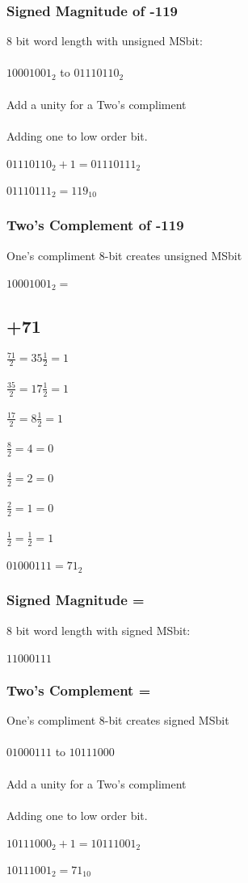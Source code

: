 \documentclass[12pt]{article}
\begin{document}
\subsubsection{Signed Magnitude of -119}
8 bit word length with unsigned MSbit: \\ \\
$10001001_2$ to $01110110_2$ \\ \\
Add a unity for a Two's compliment \\ \\
Adding one to low order bit. \\ \\
$01110110_2 + 1 = 01110111_2$ \\ \\
$01110111_2 = 119_{10}$
\subsubsection{Two's Complement of -119}
One's compliment 8-bit creates unsigned MSbit\\ \\
$10001001_2 =$
\subsection{+71}
$\frac{71}{2} = 35\frac{1}{2} = 1$ \\ \\
$\frac{35}{2} = 17\frac{1}{2} = 1$ \\ \\
$\frac{17}{2} = 8\frac{1}{2} = 1$ \\ \\
$\frac{8}{2} = 4 = 0$ \\ \\
$\frac{4}{2} = 2 = 0$ \\ \\
$\frac{2}{2} = 1 = 0$ \\ \\
$\frac{1}{2} = \frac{1}{2} = 1$ \\ \\
$01000111 = 71_2$

\subsubsection{Signed Magnitude =}
8 bit word length with signed MSbit: \\ \\
$11000111$
\subsubsection{Two's Complement =}
One's compliment 8-bit creates signed MSbit\\ \\
$01000111$ to $10111000$ \\ \\
Add a unity for a Two's compliment \\ \\
Adding one to low order bit. \\ \\
$10111000_2 + 1 = 10111001_2$ \\ \\
$10111001_2 = 71_{10}$
\end{document}
